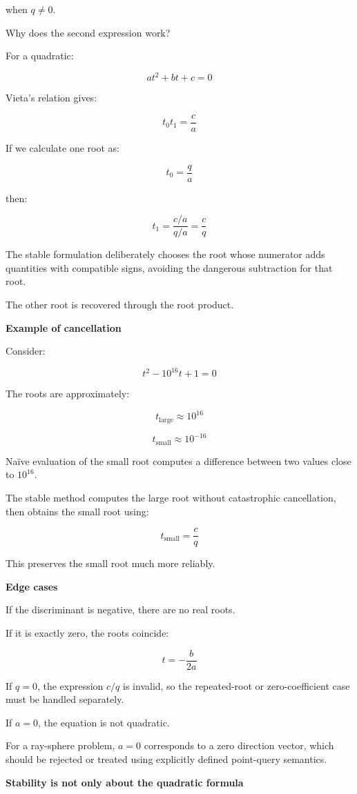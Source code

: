when \(q\ne0\).

Why does the second expression work?

For a quadratic:

\[
at^2+bt+c=0
\]

Vieta's relation gives:

\[
t_0t_1=\frac ca
\]

If we calculate one root as:

\[
t_0=\frac qa
\]

then:

\[
t_1=\frac{c/a}{q/a}=\frac cq
\]

The stable formulation deliberately chooses the root whose numerator adds quantities with compatible signs, avoiding the dangerous subtraction for that root.

The other root is recovered through the root product.

\textbf{Example of cancellation}

Consider:

\[
t^2-10^{16}t+1=0
\]

The roots are approximately:

\[
t_{\mathrm{large}}\approx10^{16}
\]

\[
t_{\mathrm{small}}\approx10^{-16}
\]

Naïve evaluation of the small root computes a difference between two values close to \(10^{16}\).

The stable method computes the large root without catastrophic cancellation, then obtains the small root using:

\[
t_{\mathrm{small}}=\frac c q
\]

This preserves the small root much more reliably.

\textbf{Edge cases}

If the discriminant is negative, there are no real roots.

If it is exactly zero, the roots coincide:

\[
t=-\frac b{2a}
\]

If \(q=0\), the expression \(c/q\) is invalid, so the repeated-root or zero-coefficient case must be handled separately.

If \(a=0\), the equation is not quadratic.

For a ray-sphere problem, \(a=0\) corresponds to a zero direction vector, which should be rejected or treated using explicitly defined point-query semantics.

\textbf{Stability is not only about the quadratic formula}

